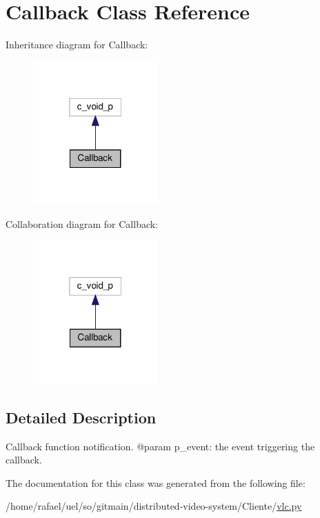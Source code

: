 \hypertarget{classvlc_1_1_callback}{}\section{Callback Class Reference}
\label{classvlc_1_1_callback}


Inheritance diagram for Callback\+:
\nopagebreak
\begin{figure}[H]
\begin{center}
\leavevmode
\includegraphics[width=136pt]{classvlc_1_1_callback__inherit__graph}
\end{center}
\end{figure}


Collaboration diagram for Callback\+:
\nopagebreak
\begin{figure}[H]
\begin{center}
\leavevmode
\includegraphics[width=136pt]{classvlc_1_1_callback__coll__graph}
\end{center}
\end{figure}


\subsection{Detailed Description}
\begin{DoxyVerb}Callback function notification.
@param p_event: the event triggering the callback.
\end{DoxyVerb}
 

The documentation for this class was generated from the following file\+:\begin{DoxyCompactItemize}
\item 
/home/rafael/uel/so/gitmain/distributed-\/video-\/system/\+Cliente/\hyperlink{vlc_8py}{vlc.\+py}\end{DoxyCompactItemize}
